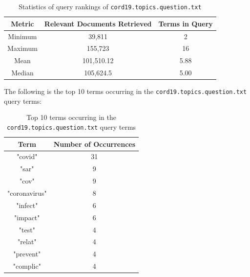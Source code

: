 \documentclass[11pt]{article}
\begin{document}
\begin{table}[!ht]
    \caption{Statistics of query rankings of \texttt{cord19.topics.question.txt}}
    \begin{center}

        \begin{tabular}{| c | c | c |}
        \hline
        \textbf{Metric} & \textbf{Relevant Documents Retrieved} & \textbf{Terms in Query}
        \\ \hline
        Minimum & 39,811 & 2
        \\ \hline
        Maximum & 155,723 & 16
        \\ \hline
        Mean & 101,510.12 & 5.88
        \\ \hline
        Median & 105,624.5 & 5.00
        \\ \hline
        \end{tabular}

    \end{center}

\end{table}

The following is the top 10 terms occurring in the  \texttt{cord19.topics.question.txt} query terms:

\begin{table}[!ht]
    \caption{Top 10 terms occurring in the \texttt{cord19.topics.question.txt} query terms}
    \begin{center}

        \begin{tabular}{| c | c |}
        \hline
        \textbf{Term} & \textbf{Number of Occurrences}
        \\ \hline
        "covid" & 31
        \\ \hline
        "sar" & 9
        \\ \hline
        "cov" & 9
        \\ \hline
        "coronavirus" & 8
        \\ \hline
        "infect" & 6
        \\ \hline
        "impact" & 6
        \\ \hline
        "test" & 4
        \\ \hline
        "relat" & 4
        \\ \hline
        "prevent" & 4
        \\ \hline
        "complic" & 4
        \\ \hline
        \end{tabular}

    \end{center}

\end{table}
\end{document}
